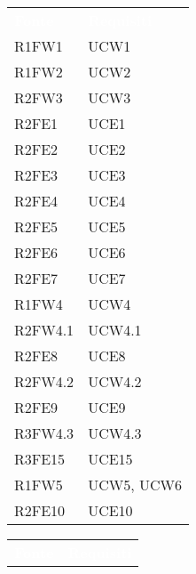 \begin{table}[!htbp]
\renewcommand{\arraystretch}{1.5}
\begin{tabular}{ m{}<{\centering}  m{}<{\centering} }
	\rowcolor{darkblue}
	\textcolor{white}{\textbf{Fonte}} &\textcolor{white}{\textbf{Requisiti}}\\ 

	R1FW1 & UCW1 \\	
	 
	R1FW2 & UCW2\\	

	R2FW3 & UCW3\\	
	 
	R2FE1 & UCE1\\	
	 
 	R2FE2 & UCE2\\	
	 
	R2FE3 & UCE3\\	

	R2FE4 & UCE4\\	
	
	R2FE5 & UCE5 \\
	 
	R2FE6 & UCE6 \\	 
	 
	R2FE7 & UCE7\\	

	R1FW4 & UCW4 \\ 
	 
	R2FW4.1 & UCW4.1\\	
	 
	R2FE8 & UCE8\\	
	 
	R2FW4.2 & UCW4.2\\		 

	R2FE9 & UCE9 \\		
	 
	R3FW4.3 & UCW4.3\\				
	 
	R3FE15 & UCE15\\			
	  	 	 	
	R1FW5 & UCW5, UCW6\\		
	 
	R2FE10 & UCE10\\

\end{tabular}
\begin{tabular}{ m{}<{\centering}  m{}<{\centering} }
	\rowcolor{darkblue}
	\textcolor{white}{\textbf{Fonte}} &\textcolor{white}{\textbf{Requisiti}}\\ 


\end{tabular}
\end{table}
